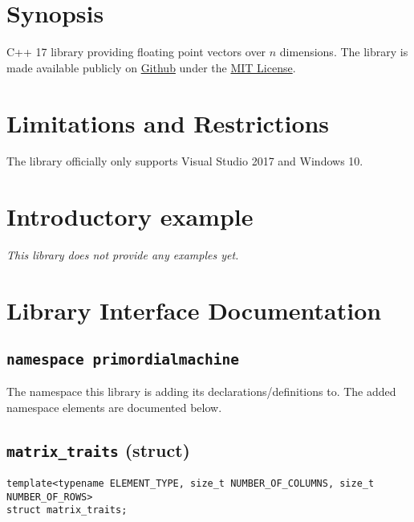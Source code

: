 \documentclass[oneside]{book}
\begin{document}
\frontmatter

\begin{titlepage}
\maketitle
\end{titlepage}

\tableofcontents
{}

\mainmatter

\chapter{Synopsis}
C++ 17 library providing floating point vectors over $n$ dimensions.
The library is made available publicly on
\href{\GetLibraryRepository}{Github}
under the
\href{\GetLibraryRepository/blob/master/LICENSE}{MIT License}.

\chapter{Limitations and Restrictions}
The library officially only supports Visual Studio 2017 and Windows 10.

\chapter{Introductory example}
\textit{\color{orange}This library does not provide any examples yet.}



\chapter{Library Interface Documentation}

\section{\texttt{namespace primordialmachine}}
The namespace this library is adding its declarations/definitions to.
The added namespace elements are documented below.




\section{\texttt{matrix\_traits} (struct)}
\begin{verbatim}
template<typename ELEMENT_TYPE, size_t NUMBER_OF_COLUMNS, size_t NUMBER_OF_ROWS>
struct matrix_traits;
\end{verbatim}
\end{document}

